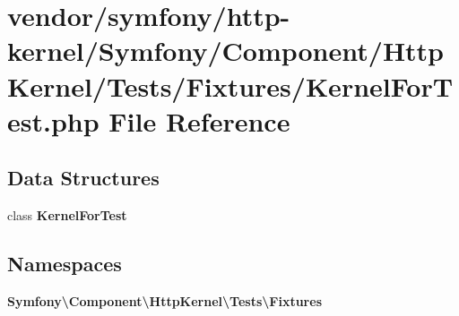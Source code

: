 \section{vendor/symfony/http-\/kernel/\+Symfony/\+Component/\+Http\+Kernel/\+Tests/\+Fixtures/\+Kernel\+For\+Test.php File Reference}
\label{_kernel_for_test_8php}
\subsection*{Data Structures}
\begin{DoxyCompactItemize}
\item 
class {\bf Kernel\+For\+Test}
\end{DoxyCompactItemize}
\subsection*{Namespaces}
\begin{DoxyCompactItemize}
\item 
 {\bf Symfony\textbackslash{}\+Component\textbackslash{}\+Http\+Kernel\textbackslash{}\+Tests\textbackslash{}\+Fixtures}
\end{DoxyCompactItemize}
